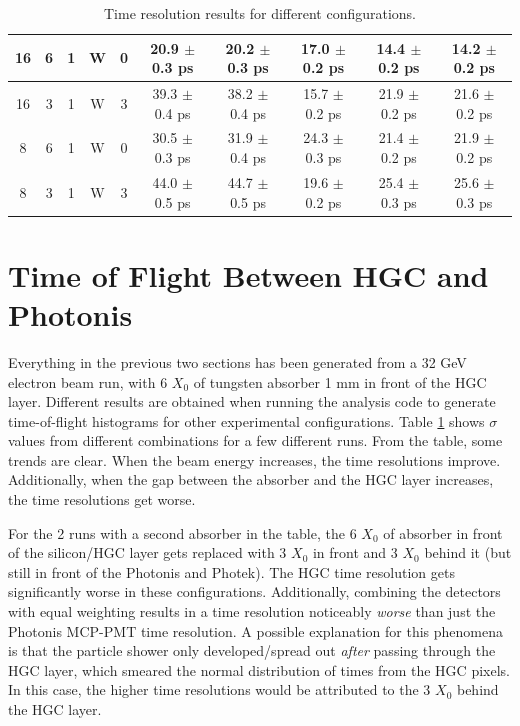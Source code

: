 \documentclass[twocolumn,aps,prd,reprint,superscriptaddress,floatfix]{revtex4-1}
\begin{document}
\begin{table}
\begin{tabular}{ |c|c|c|c|c|c|c|c|c|c| }
16 & 6 & 1 & W & 0 & 20.9 $\pm$ 0.3 ps & 20.2 $\pm$ 0.3 ps & 17.0 $\pm$ 0.2 ps & 14.4 $\pm$ 0.2 ps & 14.2 $\pm$ 0.2 ps 
\\ \hline
16 & 3 & 1 & W & 3 & 39.3 $\pm$ 0.4 ps & 38.2 $\pm$ 0.4 ps & 15.7 $\pm$ 0.2 ps & 21.9 $\pm$ 0.2 ps & 21.6 $\pm$ 0.2 ps 
\\ \hline
8 & 6 & 1 & W & 0 & 30.5 $\pm$ 0.3 ps & 31.9 $\pm$ 0.4 ps & 24.3 $\pm$ 0.3 ps & 21.4 $\pm$ 0.2 ps & 21.9 $\pm$ 0.2 ps 
\\ \hline
8 & 3 & 1 & W & 3 & 44.0 $\pm$ 0.5 ps & 44.7 $\pm$ 0.5 ps & 19.6 $\pm$ 0.2 ps & 25.4 $\pm$ 0.3 ps & 25.6 $\pm$ 0.3 ps 
\\ \hline
\end{tabular}
	\caption{Time resolution results for different configurations.}
	\label{table:results}
\end{table}

\section{Time of Flight Between HGC and Photonis}
Everything in the previous two sections has been generated from a 32 GeV electron beam run, with 6 $X_0$ of tungsten absorber 1 mm in front of the HGC layer. 
Different results are obtained when running the analysis code to generate time-of-flight histograms for other experimental configurations.
Table \ref{table:results} shows $\sigma$ values from different combinations for a few different runs.
From the table, some trends are clear. 
When the beam energy increases, the time resolutions improve. 
Additionally, when the gap between the absorber and the HGC layer increases, the time resolutions get worse.

For the 2 runs with a second absorber in the table, the 6 $X_0$ of absorber in front of the silicon/HGC layer gets replaced with 3 $X_0$ in front and 3 $X_0$ behind it (but still in front of the Photonis and Photek).
The HGC time resolution gets significantly worse in these configurations.
Additionally, combining the detectors with equal weighting results in a time resolution noticeably \textit{worse} than just the Photonis MCP-PMT time resolution.
A possible explanation for this phenomena is that the particle shower only developed/spread out \textit{after} passing through the HGC layer, which smeared the normal distribution of times from the HGC pixels. 
In this case, the higher time resolutions would be attributed to the 3 $X_0$ behind the HGC layer.
\end{document}
